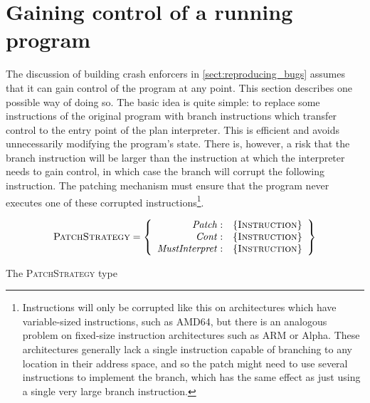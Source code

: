 \chapter{Gaining control of a running program}
\label{sect:enforce:gain_control}


The discussion of building crash enforcers in
\autoref{sect:reproducing_bugs} assumes that it can gain control of
the program at any point.  This section describes one possible way of
doing so.  The basic idea is quite simple: to replace some
instructions of the original program with branch instructions which
transfer control to the entry point of the plan interpreter.  This is
efficient and avoids unnecessarily modifying the program's state.
There is, however, a risk that the branch instruction will be larger
than the instruction at which the interpreter needs to gain control,
in which case the branch will corrupt the following instruction.  The
patching mechanism must ensure that the program never executes one of
these corrupted instructions\footnote{Instructions will only be
  corrupted like this on architectures which have variable-sized
  instructions, such as AMD64, but there is an analogous problem on
  fixed-size instruction architectures such as ARM or Alpha.  These
  architectures generally lack a single instruction capable of
  branching to any location in their address space, and so the patch
  might need to use several instructions to implement the branch,
  which has the same effect as just using a single very large branch
  instruction.}.

\begin{sanefig}
  \begin{displaymath}
    \textsc{PatchStrategy} = \left\{\begin{array}{rl}
    \mathit{Patch}: & \{\textsc{Instruction}\} \\
    \mathit{Cont}: & \{\textsc{Instruction}\} \\
    \mathit{MustInterpret}: & \{\textsc{Instruction}\}
    \end{array}\right\}
  \end{displaymath}
  \vspace{-12pt}
  \caption{The \textsc{PatchStrategy} type}
  \label{fig:patch_strategy_type}
\end{sanefig}

